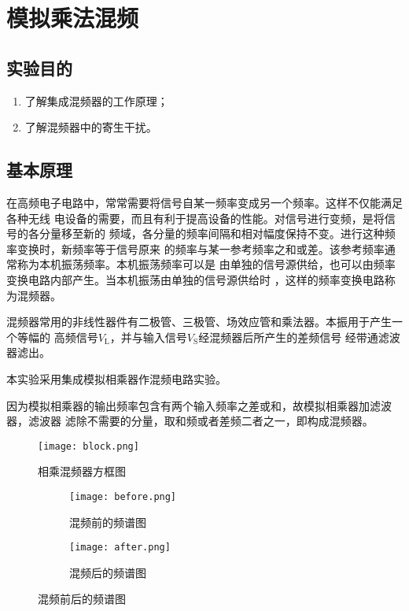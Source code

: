 \documentclass[../main]{subfiles}
\begin{document}
\chapter{模拟乘法混频}%
\label{cha:模拟乘法混频}

\section{实验目的}%
\label{sec:\arabic{chapter}实验目的}

\begin{enumerate}

	\item 了解集成混频器的工作原理；

	\item 了解混频器中的寄生干扰。

\end{enumerate}

\section{基本原理}%
\label{sec:\arabic{chapter}基本原理}

在高频电子电路中，常常需要将信号自某一频率变成另一个频率。这样不仅能满足各种无线
电设备的需要，而且有利于提高设备的性能。对信号进行变频，是将信号的各分量移至新的
频域，各分量的频率间隔和相对幅度保持不变。进行这种频率变换时，新频率等于信号原来
的频率与某一参考频率之和或差。该参考频率通常称为本机振荡频率。本机振荡频率可以是
由单独的信号源供给，也可以由频率变换电路内部产生。当本机振荡由单独的信号源供给时
，这样的频率变换电路称为混频器。

混频器常用的非线性器件有二极管、三极管、场效应管和乘法器。本振用于产生一个等幅的
高频信号$ V_\mathrm{L} $，并与输入信号$ V_\mathrm{S} $经混频器后所产生的差频信号
经带通滤波器滤出。

本实验采用集成模拟相乘器作混频电路实验。

因为模拟相乘器的输出频率包含有两个输入频率之差或和，故模拟相乘器加滤波器，滤波器
滤除不需要的分量，取和频或者差频二者之一，即构成混频器。

\begin{figure}[htbp]
	\centering
	\texttt{[image: block.png]}
	\caption{相乘混频器方框图}
	\label{fig:相乘混频器方框图}
\end{figure}

\begin{figure}[htbp]
	\centering
	\begin{subfigure}[htbp]{.45\linewidth}
		\centering
		\texttt{[image: before.png]}
		\caption{混频前的频谱图}
		\label{fig:混频前的频谱图}
	\end{subfigure}
	\quad
	\begin{subfigure}[htbp]{.45\linewidth}
		\centering
		\texttt{[image: after.png]}
		\caption{混频后的频谱图}
		\label{fig:混频后的频谱图}
	\end{subfigure}
	\caption{混频前后的频谱图}
	\label{fig:混频前后的频谱图}
\end{figure}
\end{document}
